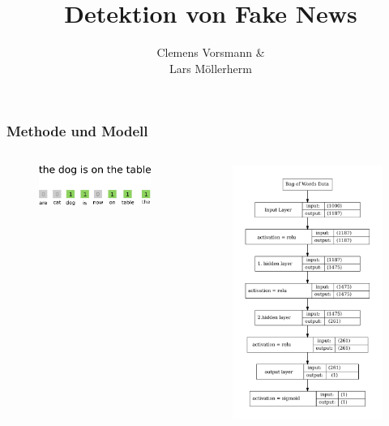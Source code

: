 \documentclass[aspectratio=1610, professionalfonts, 9pt]{beamer}
\title{Detektion von Fake News}
\author{%
  Clemens Vorsmann \& \\ 
  Lars Möllerherm
}
\institute{Fakultät Physik}
\begin{document}
  \begin{frame}
    \titlepage
  \end{frame}

  \begin{frame}
    \frametitle{Methode und Modell}
    \begin{columns}
      \begin{figure}
          \includegraphics[width=\textwidth]{pictures/bow_schematisch.png}
          \caption{\cite{bow_pic}}
          \label{}
      \end{figure}
      \begin{figure}
          \includegraphics[width=\textwidth]{pictures/bow/opt_model_bow2.pdf}

\end{figure}
\end{columns}
\end{frame}
\end{document}

